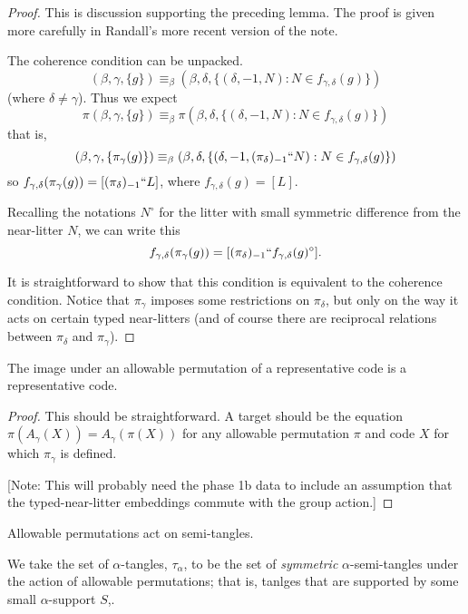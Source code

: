 \begin{proof}
This is discussion supporting the preceding lemma. The proof is given more carefully in Randall’s more recent version of the note.

The coherence condition can be unpacked.
$$(\beta,\gamma,\{g\}) \equiv_\beta (\beta,\delta,\{(\delta,-1,N):N \in f_{\gamma,\delta}(g)\})$$(where $\delta\neq \gamma$).  Thus we expect
$$\pi(\beta,\gamma,\{g\}) \equiv_\beta \pi(\beta,\delta,\{(\delta,-1,N):N \in f_{\gamma,\delta}(g)\})$$
that is,
$$(\beta,\gamma,\{\pi_\gamma(g)\}) \equiv_\beta (\beta,\delta,\{(\delta,-1,(\pi_\delta)_{-1}``N):N \in f_{\gamma,\delta}(g)\})$$
so $f_{\gamma,\delta}(\pi_\gamma(g)) = [(\pi_\delta)_{-1}``L]$, where $f_{\gamma,\delta}(g)=[L]$.

Recalling the notations $N^\circ$ for the litter with small symmetric difference from the near-litter $N$, we can write this $$f_{\gamma,\delta}(\pi_\gamma(g)) = [(\pi_\delta)_{-1}``f_{\gamma,\delta}(g)^\circ].$$

It is straightforward to show that this condition is equivalent to the coherence condition.  Notice that $\pi_\gamma$ imposes some restrictions on $\pi_\delta$, but only on the way it acts on certain typed near-litters (and of course there are reciprocal relations between $\pi_\delta$ and $\pi_\gamma$).
\end{proof}

\begin{lemma}
\label{lem:rep-preserved}
The image under an allowable permutation of a representative code is a representative code.
\end{lemma}

\begin{proof}
This should be straightforward.  A target should be the equation $\pi(A_\gamma(X)) = A_\gamma(\pi(X))$ for any allowable permutation $\pi$ and code $X$ for which $\pi_\gamma$ is defined.

[Note: This will probably need the phase 1b data to include an assumption that the typed-near-litter embeddings commute with the group action.]
\end{proof}

\begin{lemma}
\label{lem:semi-tangle-action}
  Allowable permutations act on semi-tangles.
\end{lemma}

\begin{definition}
\label{def:tangle}
We take the set of $\alpha$-tangles, $\tau_\alpha$, to be the set of \emph{symmetric} $\alpha$-semi-tangles under the action of allowable permutations; that is, tanlges that are supported by some small $\alpha$-support $S$,.
\end{definition}

